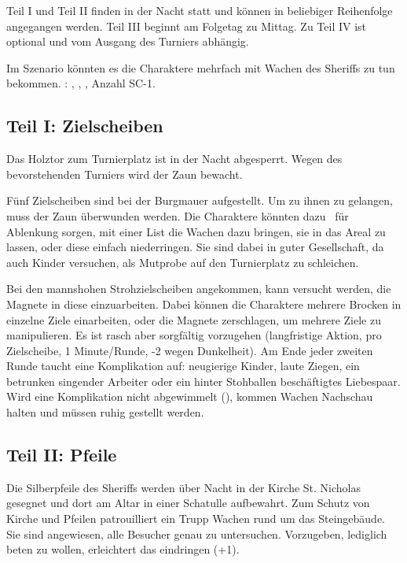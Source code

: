 {	

		\noindent
		Teil I und Teil II finden in der Nacht statt und können in beliebiger Reihenfolge angegangen werden. Teil III beginnt am Folgetag zu Mittag. Zu Teil IV ist optional und vom Ausgang des Turniers abhängig.

		Im Szenario könnten es die Charaktere mehrfach mit Wachen des Sheriffs zu tun bekommen. : , , , Anzahl SC-1.

		\subsection{Teil I: Zielscheiben}

		Das Holztor zum Turnierplatz ist in der Nacht abgesperrt. Wegen des bevorstehenden Turniers wird der Zaun bewacht.

		Fünf Zielscheiben sind bei der Burgmauer aufgestellt. Um zu ihnen zu gelangen, muss der Zaun überwunden werden. Die Charaktere könnten dazu \zB~für Ablenkung sorgen, mit einer List die Wachen dazu bringen, sie in das Areal zu lassen, oder diese einfach niederringen. Sie sind dabei in guter Gesellschaft, da auch Kinder versuchen, als Mutprobe auf den Turnierplatz zu schleichen.

		Bei den mannshohen Strohzielscheiben angekommen, kann versucht werden, die Magnete in diese einzuarbeiten. Dabei können die Charaktere mehrere Brocken in einzelne Ziele einarbeiten, oder die Magnete zerschlagen, um mehrere Ziele zu manipulieren. Es ist rasch aber sorgfältig vorzugehen (langfristige Aktion,  pro Zielscheibe, 1 Minute/Runde, -2 wegen Dunkelheit). Am Ende jeder zweiten Runde taucht eine Komplikation auf: neugierige Kinder, laute Ziegen, ein betrunken singender Arbeiter oder ein hinter Stohballen beschäftigtes Liebespaar. Wird eine Komplikation nicht abgewimmelt (), kommen Wachen Nachschau halten und müssen ruhig gestellt werden.

		\subsection{Teil II: Pfeile}

		Die Silberpfeile des Sheriffs werden über Nacht in der Kirche St. Nicholas gesegnet und dort am Altar in einer Schatulle aufbewahrt. Zum Schutz von Kirche und Pfeilen patrouilliert ein Trupp Wachen rund um das Steingebäude. Sie sind angewiesen, alle Besucher genau zu untersuchen. Vorzugeben, lediglich beten zu wollen, erleichtert das eindringen (+1).

}

